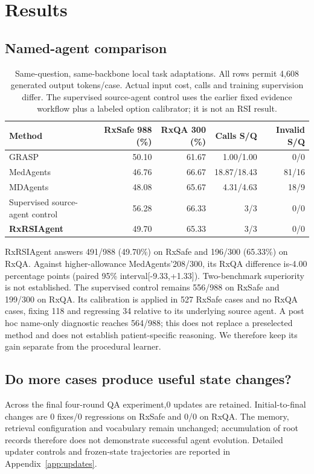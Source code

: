 \section{Results}
\subsection{Named-agent comparison}
\begin{table}[t]\centering\small
\setlength{\tabcolsep}{4pt}
\caption{Same-question, same-backbone local task adaptations. All rows permit 4,608 generated output tokens/case. Actual input cost, calls and training supervision differ. The supervised source-agent control uses the earlier fixed evidence workflow plus a labeled option calibrator; it is not an RSI result.}
\label{tab:main}
\begin{tabular}{@{}lrrrr@{}}\toprule
Method & RxSafe 988 (\%) & RxQA 300 (\%) & Calls S/Q & Invalid S/Q\\\midrule
GRASP \citep{grasp} & 50.10 & 61.67 & 1.00/1.00 & 0/0\\
MedAgents \citep{medagents} & 46.76 & 66.67 & 18.87/18.43 & 81/16\\
MDAgents \citep{mdagents} & 48.08 & 65.67 & 4.31/4.63 & 18/9\\
Supervised source-agent control & 56.28 & 66.33 & 3/3 & 0/0\\
\textbf{RxRSIAgent} & 49.70 & 65.33 & 3/3 & 0/0\\
\bottomrule\end{tabular}
\end{table}
RxRSIAgent answers 491/988 (49.70\%) on RxSafe and 196/300 (65.33\%) on RxQA. Against higher-allowance MedAgents'208/300, its RxQA difference is-4.00 percentage points (paired 95\% interval[-9.33,+1.33]). Two-benchmark superiority is not established.
The supervised control remains 556/988 on RxSafe and 199/300 on RxQA. Its calibration is applied in 527 RxSafe cases and no RxQA cases, fixing 118 and regressing 34 relative to its underlying source agent. A post hoc name-only diagnostic reaches 564/988; this does not replace a preselected method and does not establish patient-specific reasoning. We therefore keep its gain separate from the procedural learner.

\subsection{Do more cases produce useful state changes?}
Across the final four-round QA experiment,0 updates are retained. Initial-to-final changes are 0 fixes/0 regressions on RxSafe and 0/0 on RxQA. The memory, retrieval configuration and vocabulary remain unchanged; accumulation of root records therefore does not demonstrate successful agent evolution.
Detailed updater controls and frozen-state trajectories are reported in Appendix~\ref{app:updates}.

